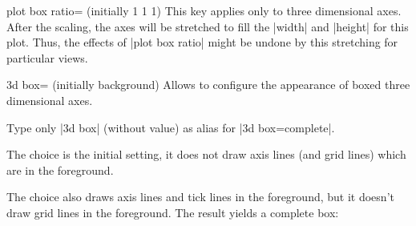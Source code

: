 {\begin{pgfplotskey}{plot box ratio= (initially 1 1 1)}
    This key applies only to three dimensional axes. After the scaling, the
    axes will be stretched to fill the |width| and |height| for this plot.
    Thus, the effects of |plot box ratio| might be undone by this stretching
    for particular views.
\end{pgfplotskey}

\begin{pgfplotskey}{3d box= (initially background)}
\label{pgfplots:key:3dbox}
    Allows to configure the appearance of boxed three dimensional axes.

    Type only |3d box| (without value) as alias for |3d box=complete|.

    The choice  is the initial setting, it does not
    draw axis lines (and grid lines) which are in the foreground.
\begin{codeexample}[]
\end{codeexample}

    The choice  also draws axis lines and tick lines in
    the foreground, but it doesn't draw grid lines in the foreground. The
    result yields a complete box:
\begin{codeexample}[]
\end{codeexample}


\end{pgfplotskey}}
